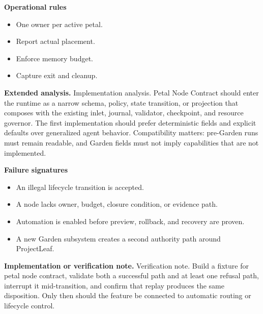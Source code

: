 \documentclass[10pt,letterpaper,oneside]{article}
\begin{document}
\textbf{Operational rules}
\begin{itemize}
\item One owner per active petal.
\item Report actual placement.
\item Enforce memory budget.
\item Capture exit and cleanup.
\end{itemize}
\textbf{Extended analysis.} Implementation analysis. Petal Node Contract should enter the runtime as a narrow schema, policy, state transition, or projection that composes with the existing inlet, journal, validator, checkpoint, and resource governor. The first implementation should prefer deterministic fields and explicit defaults over generalized agent behavior. Compatibility matters: pre-Garden runs must remain readable, and Garden fields must not imply capabilities that are not implemented.

\textbf{Failure signatures}
\begin{itemize}
\item An illegal lifecycle transition is accepted.
\item A node lacks owner, budget, closure condition, or evidence path.
\item Automation is enabled before preview, rollback, and recovery are proven.
\item A new Garden subsystem creates a second authority path around ProjectLeaf.
\end{itemize}
\textbf{Implementation or verification note.} Verification note. Build a fixture for petal node contract, validate both a successful path and at least one refusal path, interrupt it mid-transition, and confirm that replay produces the same disposition. Only then should the feature be connected to automatic routing or lifecycle control.
\end{document}
